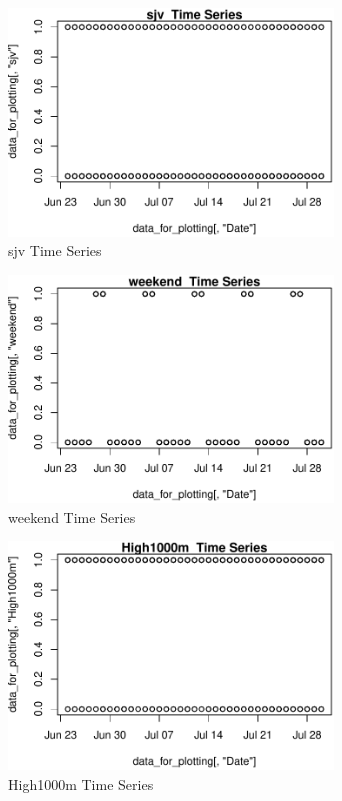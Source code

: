 \begin{figure} 
\centering  
\includegraphics[width=0.77\textwidth]{Code_Outputs/ML_input_report_AllforCaret_cleaned_StepPractice_part_practice_sjvTS.pdf} 
\caption{\label{fig:ML_input_report_AllforCaret_cleaned_StepPractice_part_practicesjvTS}sjv  Time Series} 
\end{figure} 
 

\begin{figure} 
\centering  
\includegraphics[width=0.77\textwidth]{Code_Outputs/ML_input_report_AllforCaret_cleaned_StepPractice_part_practice_weekendTS.pdf} 
\caption{\label{fig:ML_input_report_AllforCaret_cleaned_StepPractice_part_practiceweekendTS}weekend  Time Series} 
\end{figure} 
 

\begin{figure} 
\centering  
\includegraphics[width=0.77\textwidth]{Code_Outputs/ML_input_report_AllforCaret_cleaned_StepPractice_part_practice_High1000mTS.pdf} 
\caption{\label{fig:ML_input_report_AllforCaret_cleaned_StepPractice_part_practiceHigh1000mTS}High1000m  Time Series} 
\end{figure} 
 

